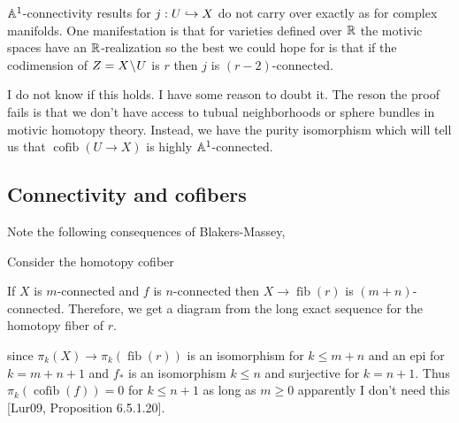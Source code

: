 \documentclass[12pt]{article}
\DeclareMathOperator{\fib}{\mathrm{fib}}
\DeclareMathOperator{\cofib}{\mathrm{cofib}}
\begin{document}
$\mathbb{A}^1$-connectivity results for $j : U \hookrightarrow X$ do not carry over exactly as for complex manifolds. One manifestation is that for varieties defined over $\mathbb{R}$ the motivic spaces have an $\mathbb{R}$-realization so the best we could hope for is that if the codimension of $Z = X \! \setminus \! U$ is $r$ then $j$ is $(r-2)$-connected. 

I do not know if this holds. I have some reason to doubt it. The reson the proof fails is that we don't have access to tubual neighborhoods or sphere bundles in motivic homotopy theory. Instead, we have the purity isomorphism which will tell us that $\cofib(U \to X)$ is highly $\mathbb{A}^1$-connected.

\subsection{Connectivity and cofibers}

Note the following consequences of Blakers-Massey,

\begin{prop}
Consider the homotopy cofiber
\begin{center}
\end{center}
If $X$ is $m$-connected and $f$ is $n$-connected then $X \to \fib(r)$ is $(m+n)$-connected. Therefore, we get a diagram from the long exact sequence for the homotopy fiber of $r$.
\begin{center}
\end{center}
since $\pi_k(X) \to \pi_k(\fib(r))$ is an isomorphism for $k \le m+n$ and an epi for $k = m + n + 1$ and $f_*$ is an isomorphism $k \le n$ and surjective for $k = n+1$. Thus $\pi_k(\cofib(f)) = 0$ for $k \le n+1$ as long as $m \ge 0$ {\color{red} apparently I don't need this [Lur09, Proposition 6.5.1.20]}.
\end{prop}
\end{document}
